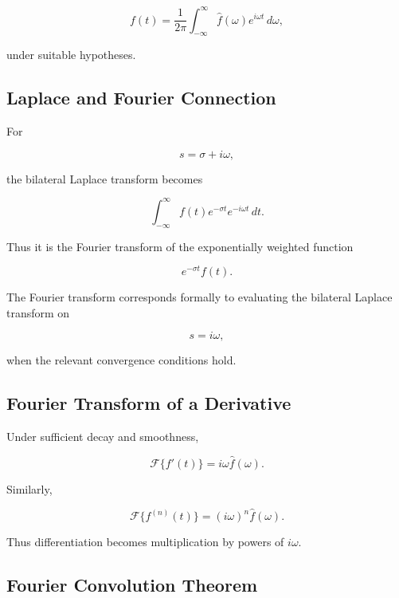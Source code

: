 \[
\boxed{
f(t)
=
\frac1{2\pi}
\int_{-\infty}^{\infty}
\widehat{f}(\omega)
e^{i\omega t}
\,d\omega,
}
\]

under suitable hypotheses.

\subsection{Laplace and Fourier Connection}
\label{subsec:laplace-fourier-connection}

For

\[
s=\sigma+i\omega,
\]

the bilateral Laplace transform becomes

\[
\int_{-\infty}^{\infty}
f(t)
e^{-\sigma t}
e^{-i\omega t}
\,dt.
\]

Thus it is the Fourier transform of the exponentially weighted function

\[
\boxed{
e^{-\sigma t}f(t).
}
\]

The Fourier transform corresponds formally to evaluating the bilateral
Laplace transform on

\[
\boxed{
s=i\omega,
}
\]

when the relevant convergence conditions hold.

\subsection{Fourier Transform of a Derivative}
\label{subsec:fourier-transform-derivative}

Under sufficient decay and smoothness,

\[
\boxed{
\mathcal{F}\{f'(t)\}
=
i\omega
\widehat{f}(\omega).
}
\]

Similarly,

\[
\boxed{
\mathcal{F}\{f^{(n)}(t)\}
=
(i\omega)^n
\widehat{f}(\omega).
}
\]

Thus differentiation becomes multiplication by powers of \(i\omega\).

\subsection{Fourier Convolution Theorem}
\label{subsec:fourier-convolution}

